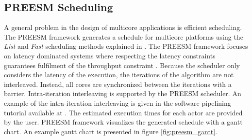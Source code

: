 \subsection{PREESM Scheduling}
\label{sec:preesmsched}
A general problem in the design of multicore applications is efficient scheduling. The PREESM framework generates a schedule for multicore platforms using the \textit{List} and \textit{Fast} scheduling methods explained in \cite{kwok1997high}. The PREESM framework focuses on latency dominated systems where respecting the latency constraints guarantees fulfilment of the throughput constraint \cite{pelcat2014preesm, ghamarian2006throughput}. Because the scheduler only considers the latency of the execution, the iterations of the algorithm are not interleaved. Instead, all cores are synchronized between the iterations with a barrier. Intra-iteration interleaving is supported by the PREESM scheduler. \cite{pelcat2014preesm} An example of the intra-iteration interleaving is given in the software pipelining tutorial available at \cite{preesm} . The estimated execution times for each actor are provided by the user. PREESM framework visualizes the generated schedule with a gantt chart. An example gantt chart is presented in figure \ref{fig:preesm_gantt}.\\ 
